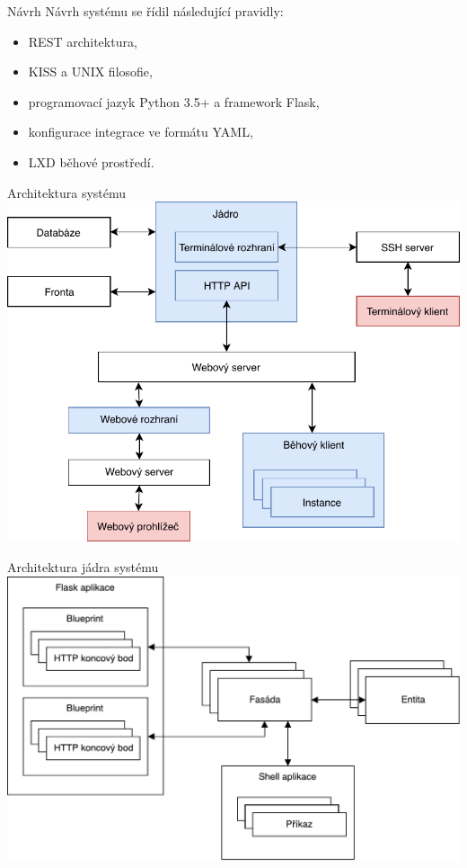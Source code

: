 \documentclass{beamer}
\begin{document}
\begin{frame}{Návrh}
Návrh systému se řídil následující pravidly:
\begin{itemize}
	\item REST architektura,
	\item KISS a UNIX filosofie,
	\item programovací jazyk Python 3.5+ a framework Flask,
	\item konfigurace integrace ve formátu YAML,
	\item LXD běhové prostředí.
\end{itemize}
\end{frame}

\begin{frame}{Architektura systému}
	\hfill
	\includegraphics[height=.8\paperheight]{img/architektura_piper.pdf}
	\hfill
\end{frame}

\begin{frame}{Architektura jádra systému}
	\hfill
	\includegraphics[width=.88\paperwidth]{img/core.pdf}
	\hfill
\end{frame}
\end{document}
